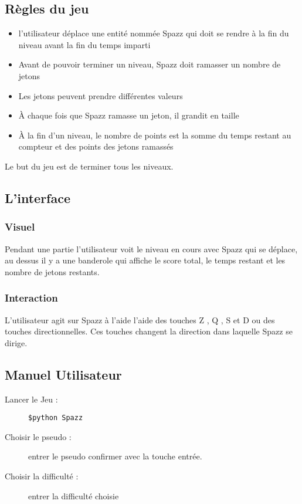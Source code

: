 \documentclass[a4paper,11pt]{article}
\begin{document}
\subsection{Règles du jeu}
\begin{itemize}[label = $\bullet$]
	\item l'utilisateur déplace une entité nommée Spazz qui doit se rendre à la fin du niveau avant la fin du temps imparti
	\item Avant de pouvoir terminer un niveau, Spazz doit ramasser un nombre de jetons
	\item Les jetons peuvent prendre différentes valeurs
	\item À chaque fois que Spazz ramasse un jeton, il grandit en taille
	\item À la fin d'un niveau, le nombre de points est la somme du temps restant au compteur et des points des jetons ramassés
\end{itemize}

Le but du jeu est de terminer tous les niveaux.

\subsection{L'interface}

\subsubsection{Visuel}

Pendant une partie l'utilisateur voit le niveau en cours avec Spazz qui se déplace, au dessus il y a une banderole qui affiche le score total, le temps restant et les nombre de jetons restants.

\subsubsection{Interaction}

L'utilisateur agit sur Spazz à l'aide l'aide des touches Z , Q , S et D ou des touches directionnelles. Ces touches changent la direction dans laquelle Spazz se dirige.


\subsection{Manuel Utilisateur}

\begin{description}
	\item [Lancer le Jeu : ] \texttt{\$python Spazz}
	\item [Choisir le pseudo : ] entrer le pseudo confirmer avec la touche entrée.
	\item [Choisir la difficulté : ] entrer la difficulté choisie
\end{description}
\end{document}
